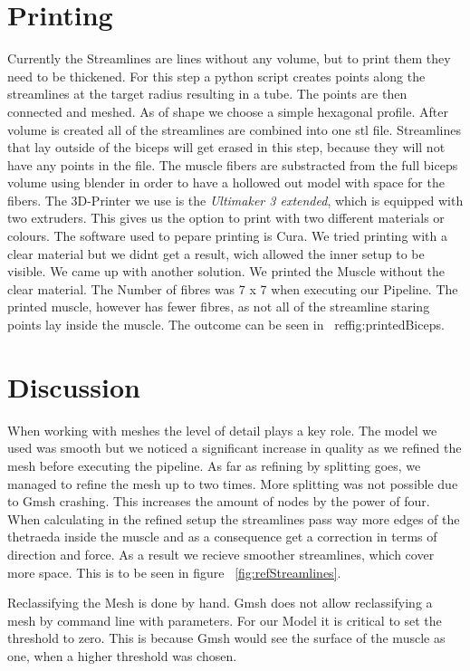 \documentclass[preprint,journal]{vgtc}       %
\begin{document}
\section{Printing}
Currently the Streamlines are lines without any volume, but to print them they need to be thickened. 
For this step a python script creates points along the streamlines at the target radius resulting in a tube.
The points are then connected and meshed. 
As of shape we choose a simple hexagonal profile. 
After volume is created all of the streamlines are combined into one stl file. 
Streamlines that lay outside of the biceps will get erased in this step, because they will not have any points in the file. 
The muscle fibers are substracted from the full biceps volume using blender in order to have a hollowed out model with space for the fibers. 
The 3D-Printer we use is the \textit{Ultimaker 3 extended}, which is equipped with two extruders. 
This gives us the option to print with two different materials or colours. %
The software used to pepare printing is Cura. 
We tried printing with a clear material but we didnt get a result, wich allowed the inner setup to be visible. We came up with another solution. We printed the Muscle without the clear material. The Number of fibres was 7 x 7 when executing our Pipeline. The printed muscle, however has fewer fibres, as not all of the streamline staring points lay inside the muscle. The outcome can be seen in ~ref{fig:printedBiceps}. 

\section{Discussion}
When working with meshes the level of detail plays a key role. The model we used was smooth but we noticed a significant increase in quality as we refined the mesh before executing the pipeline. As far as refining by splitting goes, we managed to refine the mesh up to two times. More splitting was not possible due to Gmsh crashing. This increases the amount of nodes by the power of four. When calculating in the refined setup the streamlines pass way more edges of the thetraeda inside the muscle and as a consequence get a correction in terms of direction and force. As a result we recieve smoother streamlines, which cover more space. This is to be seen in figure ~\ref{fig:refStreamlines}.

Reclassifying the Mesh is done by hand. Gmsh does not allow reclassifying a mesh by command line with parameters. For our Model it is critical to set the threshold to zero. This is because Gmsh would see the surface of the muscle as one, when a higher threshold was chosen.
\end{document}

